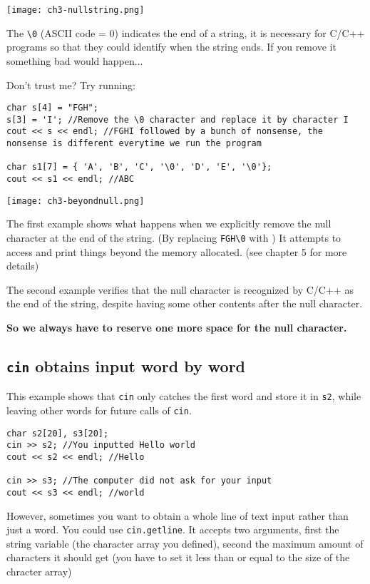 \texttt{[image: ch3-nullstring.png]}

The \texttt{\textbackslash 0} (ASCII code = 0) indicates the end of a string, it is necessary for C/C++ programs so that they could identify when the string ends. If you remove it something bad would happen...

Don't trust me? Try running:

\begin{lstlisting}
char s[4] = "FGH";
s[3] = 'I'; //Remove the \0 character and replace it by character I
cout << s << endl; //FGHI followed by a bunch of nonsense, the nonsense is different everytime we run the program

char s1[7] = { 'A', 'B', 'C', '\0', 'D', 'E', '\0'};
cout << s1 << endl; //ABC
\end{lstlisting}

\texttt{[image: ch3-beyondnull.png]}

The first example shows what happens when we explicitly remove the null character at the end of the string. (By replacing \texttt{FGH\textbackslash 0} with ) It attempts to access and print things beyond the memory allocated. (see chapter 5 for more details)

The second example verifies that the null character is recognized by C/C++ as the end of the string, despite having some other contents after the null character.

\textbf{So we always have to reserve one more space for the null character.}

\subsection*{\texttt{cin} obtains input word by word}

This example shows that \texttt{cin} only catches the first word and store it in \texttt{s2}, while leaving other words for future calls of \texttt{cin}.

\begin{lstlisting}
char s2[20], s3[20];
cin >> s2; //You inputted Hello world
cout << s2 << endl; //Hello

cin >> s3; //The computer did not ask for your input
cout << s3 << endl; //world
\end{lstlisting}

\label{sec:cingetline}
However, sometimes you want to obtain a whole line of text input rather than just a word. You could use \texttt{cin.getline}. It accepts two arguments, first the string variable (the character array you defined), second the maximum amount of characters it should get (you have to set it less than or equal to the size of the chracter array)

